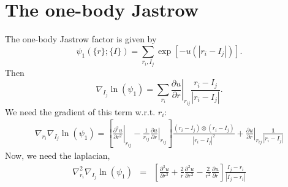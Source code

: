 \documentclass[letterpaper]{article}
\begin{document}
\section{The one-body Jastrow}
The one-body Jastrow factor is given by
\begin{equation}
\psi_1(\{r\};\{I\}) = \sum_{r_i,I_j} \exp\left[-u(|r_i - I_j|)\right].
\end{equation}
Then
\begin{equation}
\nabla_{I_j} \ln(\psi_1) = \sum_{r_i} \left.\frac{\partial u}{\partial r}\right|_{r_{ij}} \frac{r_i - I_j}{|r_i-I_j|}.
\end{equation}
We need the gradient of this term w.r.t. $r_i$:
\begin{eqnarray}
\nabla_{r_i} \nabla_{I_j} \ln(\psi_1) = 
\left[\left.\frac{\partial^2 u}{\partial r^2} \right|_{r_{ij}} 
- \frac{1}{r_{ij}}\left.\frac{\partial u}{\partial r}\right|_{r_{ij}}
\right]\frac{(r_i - I_j)\otimes(r_i-I_j)}{|r_i-I_j|^2} + \left.\frac{\partial u}{\partial r}\right|_{r_{ij}} 
\frac{\mathbf{1}}{|r_i - I_j|}
\end{eqnarray}
Now, we need the laplacian,
\begin{eqnarray}
\nabla^2_{r_i} \nabla_{I_j} \ln(\psi_1) & = & \left[
\frac{\partial^3 u}{\partial r^3} + \frac{2}{r}\frac{\partial^2u}{\partial r^2} - \frac{2}{r^2}\frac{\partial u}{\partial r} \right] 
\frac{I_j - r_i}{|I_j - r_i|}
\end{eqnarray}
\end{document}
